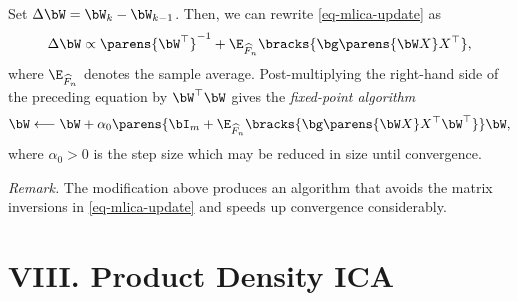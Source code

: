 \documentclass[12pt]{article}
\begin{document}
\begin{enumerate}[label=\textbf{\arabic*.}]
	Set $\Delta \bW = \bW_k - \bW_{k-1}$. Then, we can rewrite \eqref{eq-mlica-update} as 
	\begin{align*}
		\Delta \bW \propto \parens{\bW^\top}^{-1} + \E_{\widehat{F}_n} \bracks{\bg \parens{\bW X} X^\top}, 
	\end{align*}
	where $\E_{\widehat{F}_n}$ denotes the sample average. Post-multiplying the right-hand side of the preceding equation by $\bW^\top \bW$ gives the \emph{fixed-point algorithm}  
	\begin{align}\label{eq-ml-fixed-point-algo}
		\bW \longleftarrow \bW + \alpha_0 \parens{\bI_m + \E_{\widehat{F}_n} \bracks{\bg \parens{\bW X} X^\top \bW^\top} } \bW, 
	\end{align}
	where $\alpha_0 > 0$ is the step size which may be reduced in size until convergence. 
	
	\textit{Remark.} The modification above produces an algorithm that avoids the matrix inversions in \eqref{eq-mlica-update} and speeds up convergence considerably. 

\end{enumerate}


\section*{VIII. Product Density ICA}
\end{document}
